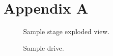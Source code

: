 \chapter{Appendix A}\label{sec:appendix a}
    \begin{figure}[h]
        \centering
        \caption[Sample stage exploded view.]{Sample stage exploded view.}%
        \label{fig:sample stage exploded}%
    \end{figure}
    \newpage
    \begin{figure}[h]
        \centering
        \caption[Sample drive.]{Sample drive.}%
        \label{fig:sample drive}%
    \end{figure}